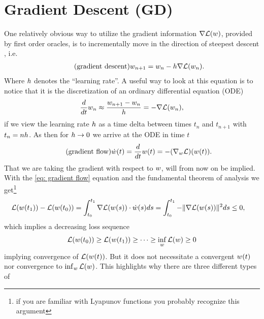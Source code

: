 
\chapter{Gradient Descent (GD)}\label{chap: gradient descent}

One relatively obvious way to utilize the gradient information
\(\nabla\mathcal{L}(w)\), provided by first order oracles, is to incrementally
move in the direction of steepest descent
\parencite{cauchyMethodeGeneralePour1847}, i.e.
%
\begin{align}
	\label{eq: gradient descent}
	\tag{gradient descent}
	w_{n+1} = w_n - h\nabla \mathcal{L}(w_n).
\end{align}
%
Where \(h\) denotes the ``learning rate''. A useful way to look at this
equation is to notice that it is the discretization of an ordinary differential
equation (ODE)
%
\begin{align*}
	\frac{d}{dt}w_n \approx \frac{w_{n+1} - w_n}{h}
	= - \nabla \mathcal{L}(w_n),
\end{align*}
%
if we view the learning rate \(h\) as a time delta between times
\(t_n\) and \(t_{n+1}\) with \(t_n = nh\). As then for
\(h\to 0\) we arrive at the ODE in time \(t\)
%
\begin{align}\label{eq: gradient flow}
	\tag{gradient flow}
	\dot{w}(t) = \frac{d}{dt}w(t)= -(\nabla_w \mathcal{L})(w(t)).
\end{align}
%
That we are taking the gradient with respect to \(w\), will from now on be
implied. With the \ref{eq: gradient flow} equation and the fundamental theorem of
analysis we get\footnote{
	if you are familiar with Lyapunov functions you probably recognize this argument
}
%
\begin{align}\label{eq: gradient integral}
	\mathcal{L}(w(t_1)) - \mathcal{L}(w(t_0))
	&= \int_{t_0}^{t_1} \nabla \mathcal{L}(w(s)) \cdot \dot{w}(s) ds
	= \int_{t_0}^{t_1} -\|\nabla \mathcal{L}(w(s))\|^2 ds
	\le 0,
\end{align}
%
which implies a decreasing loss sequence
%
\begin{align*}
	\mathcal{L}(w(t_0)) \ge \mathcal{L}(w(t_1)) \ge \dots \ge \inf_w \mathcal{L}(w) \ge 0
\end{align*}
implying convergence of \(\mathcal{L}(w(t))\). But it does not necessitate a
convergent \(w(t)\) nor convergence to \(\inf_w
\mathcal{L}(w)\). This highlights why there are three different types of
